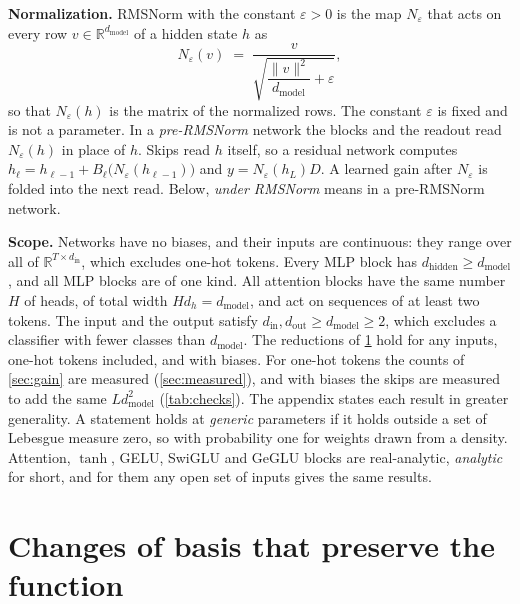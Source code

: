 \documentclass[10pt]{article}
\theoremstyle{definition}
\theoremstyle{remark}
\newcommand{\R}{\mathbb{R}}
\newcommand{\dm}{d_{\mathrm{model}}}
\newcommand{\dhid}{d_{\mathrm{hidden}}}
\newcommand{\norm}[1]{\lVert #1\rVert}
\newcommand{\para}[1]{\smallskip\noindent\textbf{#1}\hspace{0.5em}}
\begin{document}
\para{Normalization.} RMSNorm with the constant $\varepsilon > 0$ is the map $N_\varepsilon$ that acts on every row $v \in \R^{\dm}$ of a hidden state $h$ as
\[
N_\varepsilon(v) \;=\; \frac{v}{\sqrt{\dfrac{\norm{v}^2}{\dm} + \varepsilon}} ,
\]
so that $N_\varepsilon(h)$ is the matrix of the normalized rows. The constant $\varepsilon$ is fixed and is not a parameter. In a \emph{pre-RMSNorm} network the blocks and the readout read $N_\varepsilon(h)$ in place of $h$. Skips read $h$ itself, so a residual network computes $h_\ell = h_{\ell-1} + B_\ell\big(N_\varepsilon(h_{\ell-1})\big)$ and $y = N_\varepsilon(h_L)D$. A learned gain after $N_\varepsilon$ is folded into the next read. Below, \emph{under RMSNorm} means in a pre-RMSNorm network.

\para{Scope.} Networks have no biases, and their inputs are continuous: they range over all of $\R^{T\times d_{\mathrm{in}}}$, which excludes one-hot tokens. Every MLP block has $\dhid \ge \dm$, and all MLP blocks are of one kind. All attention blocks have the same number $H$ of heads, of total width $Hd_h = \dm$, and act on sequences of at least two tokens. The input and the output satisfy $d_{\mathrm{in}}, d_{\mathrm{out}} \ge \dm \ge 2$, which excludes a classifier with fewer classes than $\dm$. The reductions of \cref{sec:reduce} hold for any inputs, one-hot tokens included, and with biases. For one-hot tokens the counts of \cref{sec:gain} are measured (\cref{sec:measured}), and with biases the skips are measured to add the same $L\dm^2$ (\cref{tab:checks}). The appendix states each result in greater generality. A statement holds at \emph{generic} parameters if it holds outside a set of Lebesgue measure zero, so with probability one for weights drawn from a density. Attention, $\tanh$, GELU, SwiGLU and GeGLU blocks are real-analytic, \emph{analytic} for short, and for them any open set of inputs gives the same results.

\section{Changes of basis that preserve the function}\label{sec:reduce}\label{sec:gauge}
\end{document}
